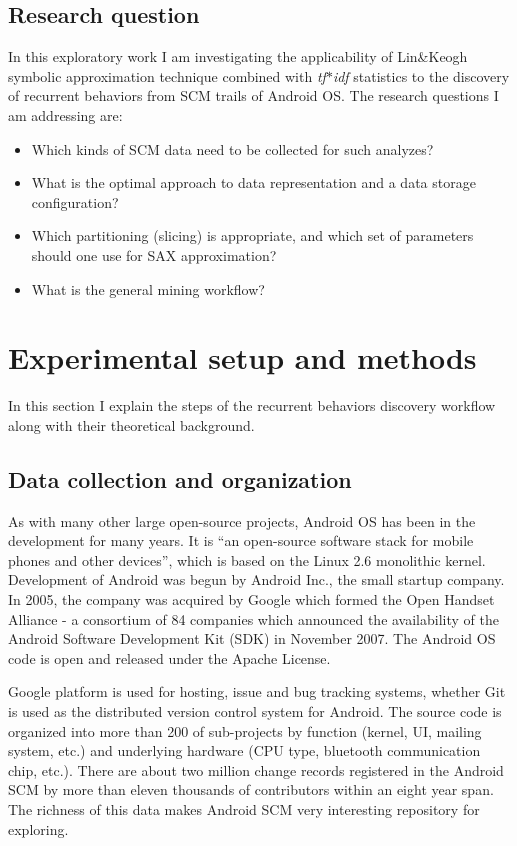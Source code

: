 \documentclass[conference]{IEEEtran}
\begin{document}
\subsection{Research question}
In this exploratory work I am investigating the applicability of Lin\&Keogh 
symbolic approximation technique combined with \textit{tf$\ast$idf} statistics to the discovery of 
recurrent behaviors from SCM trails of Android OS.
The research questions I am addressing are: 
\begin{itemize}
 \item Which kinds of SCM data need to be collected for such analyzes?
 \item What is the optimal approach to data representation and a data storage configuration?
 \item Which partitioning (slicing) is appropriate, and which set of parameters should one use for SAX approximation?
 \item What is the general mining workflow?
\end{itemize}

\section{Experimental setup and methods}
In this section I explain the steps of the recurrent behaviors discovery workflow 
along with their theoretical background.

\subsection{Data collection and organization}
As with many other large open-source projects, Android OS has been in the development for many years. 
It is ``an open-source software stack for mobile phones and other 
devices'', which is based on the Linux 2.6 monolithic kernel.
Development of Android was begun by Android Inc., the small startup company.
In 2005, the company was acquired by Google which formed the Open Handset Alliance - a consortium of 84 companies 
which announced the availability of the Android Software Development Kit (SDK) 
in November 2007. The Android OS code is open and released under the Apache License.

Google platform is used for hosting, issue and bug tracking systems, whether Git is used 
as the distributed version control system for Android. The source code is organized 
into more than 200 of sub-projects by function (kernel, UI, mailing system, etc.) 
and underlying hardware (CPU type, bluetooth communication chip, etc.). 
There are about two million change records registered in the Android SCM by more than 
eleven thousands of contributors within an eight year span. The richness of this data 
makes Android SCM very interesting repository for exploring.
\end{document}
